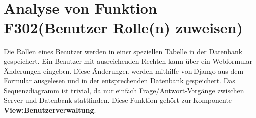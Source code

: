 \section{Analyse von Funktion F302(Benutzer Rolle(n) zuweisen)}
Die Rollen eines Benutzer werden in einer speziellen Tabelle in der Datenbank gespeichert. Ein Benutzer mit ausreichenden Rechten kann über ein Webformular Änderungen eingeben. Diese Änderungen werden mithilfe von Django aus dem Formular ausgelesen und in der entsprechenden Datenbank gespeichert. Das Sequenzdiagramm ist trivial, da nur einfach Frage/Antwort-Vorgänge zwischen Server und Datenbank stattfinden. Diese Funktion gehört zur Komponente \textbf{View:Benutzerverwaltung}.
